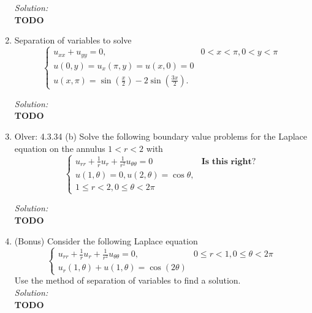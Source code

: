 \documentclass[10pt]{amsart}
\theoremstyle{nonumberplain}
\begin{document}
\begin{enumerate}[label={\bf {\arabic*}:}]
\noindent
\textit{Solution:} \\
\textbf{TODO}

\newpage


\item Separation of variables to solve
$$
\begin{cases}
u_{xx} + u_{yy} = 0, & 0 < x < \pi, 0 < y < \pi \\
u(0, y) = u_x(\pi, y) = u(x, 0) = 0 \\
u(x, \pi) = \sin \left( \frac x 2 \right) - 2 \sin \left( \frac {3x}{2} \right).
\end{cases}
$$

\noindent
\textit{Solution:} \\
\textbf{TODO}

\newpage

\item Olver: 4.3.34 (b) Solve the following boundary value problems for the Laplace equation on the annulus $1 < r < 2$ with
$$
\begin{cases}
u_{rr} + \frac 1 ru_{r} + \frac 1 {r^2} u_{\theta\theta} = 0 &\textbf{Is this right?} \\
u(1, \theta) = 0, u(2, \theta) = \cos \theta, \\
1 \leq r < 2, 0 \leq \theta < 2\pi 
\end{cases}
$$

\noindent
\textit{Solution:} \\
\textbf{TODO}

\newpage


\item (Bonus) Consider the following Laplace equation
$$
\begin{cases}
u_{rr} + \frac 1 ru_{r} + \frac 1 {r^2} u_{\theta\theta} = 0, & 0 \leq r < 1, 0 \leq \theta < 2\pi \\
u_r(1, \theta) + u(1, \theta) = \cos(2 \theta)
\end{cases}
$$
Use the method of separation of variables to find a solution. \\

\noindent
\textit{Solution:} \\
\textbf{TODO}

\newpage

\end{enumerate}
\end{document}
